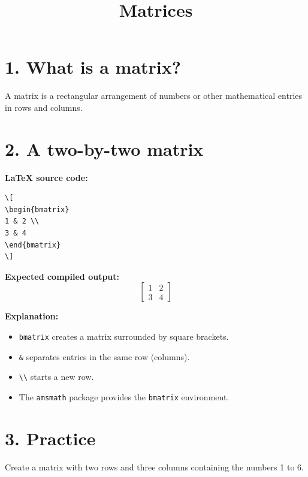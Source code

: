 \documentclass{article}
\title{Matrices}
\author{ }
\date{}
\begin{document}
\maketitle

\section*{1. What is a matrix?}
A matrix is a rectangular arrangement of numbers or other mathematical entries in rows and columns.

\section*{2. A two-by-two matrix}
\textbf{LaTeX source code:}
\begin{verbatim}
\[
\begin{bmatrix}
1 & 2 \\
3 & 4
\end{bmatrix}
\]
\end{verbatim}
\textbf{Expected compiled output:}
\[
\begin{bmatrix}
1 & 2 \\
3 & 4
\end{bmatrix}
\]

\textbf{Explanation:}
\begin{itemize}
\item \verb|bmatrix| creates a matrix surrounded by square brackets.
\item \verb|&| separates entries in the same row (columns).
\item \verb|\\| starts a new row.
\item The \verb|amsmath| package provides the \verb|bmatrix| environment.
\end{itemize}

\section*{3. Practice}
Create a matrix with two rows and three columns containing the numbers 1 to 6.
\end{document}
